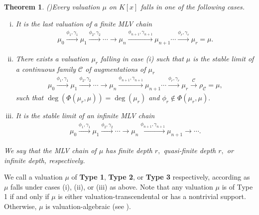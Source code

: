 \documentclass[11pt]{amsart}
\newtheorem{theorem}{Theorem}[section]
\theoremstyle{definition}
\theoremstyle{remark}
\numberwithin{equation}{section}
\begin{document}
\begin{theorem}(\cite[Theorem 4.3]{EN1})\label{mlvt1}
	Every valuation $\mu$ on $K[x]$ falls in one of the following cases. 
	\begin{enumerate}[(i)]
		\item It is the last valuation of a finite MLV chain
		\begin{align*}
			\mu_0\xrightarrow{\phi_1,\gamma_1} \mu_1\xrightarrow{\phi_2,\gamma_2}\cdots\longrightarrow \mu_{n}\xrightarrow{\phi_{n+1},\gamma_{n+1}} \mu_{n+1}\cdots\xrightarrow{\phi_r,\gamma_r} \mu_r=\mu.
		\end{align*}
		\item There exists a valuation $\mu_r$ falling in case (i) such that $\mu$  is the stable limit of a continuous family ${\mathcal{C}}$ of augmentations of $\mu_r$
		\begin{align*}
			\mu_0\xrightarrow{\phi_1,\gamma_1} \mu_1\xrightarrow{\phi_2,\gamma_2}\cdots\longrightarrow\mu_{n}\xrightarrow{\phi_{n+1},\gamma_{n+1}} \mu_{n+1}\cdots\xrightarrow{\phi_r,\gamma_r} \mu_r\xrightarrow {{\mathcal{C}}} \rho_{\mathcal{C}}=\mu,
		\end{align*}
		such that $\deg(\Phi(\mu_r,\mu))=\deg(\mu_r)$ and $\phi_r\notin \Phi(\mu_r, \mu).$
		\item It is the stable limit of an infinite MLV chain 
		\begin{align*}
			\mu_0\xrightarrow{\phi_1,\gamma_1} \mu_1\xrightarrow{\phi_2,\gamma_2}\cdots \longrightarrow \mu_{n}\xrightarrow{\phi_{n+1},\gamma_{n+1}} \mu_{n+1}\longrightarrow\cdots .
		\end{align*}
	\end{enumerate}
	We say that the MLV chain of  $\mu$ has finite depth $r,$ quasi-finite depth $r,$ or infinite depth, respectively.
\end{theorem}

We call a valuation $\mu$ of {\bf Type 1}, {\bf Type 2}, or {\bf Type 3} respectively, according as $\mu$ falls under cases (i), (ii), or (iii) as above. 
	Note that any valuation $\mu$ is of Type 1  if and only if $\mu$ is either valuation-transcendental or has a nontrivial support. Otherwise, $\mu$ is valuation-algebraic (see \cite[Lemma 4.5]{EN1}).
\end{document}
